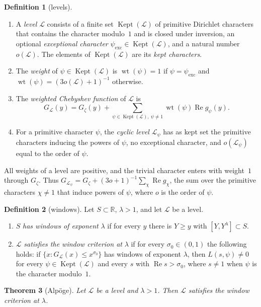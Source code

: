\documentclass[11pt]{amsbook}
\theoremstyle{plain}
\newtheorem{theorem}{Theorem}[section]
\theoremstyle{definition}
\newtheorem{definition}[theorem]{Definition}
\theoremstyle{remark}
\numberwithin{equation}{section}
\numberwithin{figure}{chapter}
\numberwithin{table}{chapter}
\newcommand{\R}{\mathbb{R}}
\newcommand{\lev}{\mathscr{L}}
\newcommand{\Gz}{G_{\zeta}}
\newcommand{\Kept}{\operatorname{Kept}}
\newcommand{\wt}{\operatorname{wt}}
\begin{document}
\begin{definition}[levels]\label{def:level}
\begin{enumerate}[label=(\arabic*)]
\item A \emph{level} $\lev$ consists of a finite set $\Kept(\lev)$ of
primitive Dirichlet characters that contains the character
modulo~$1$ and is closed under inversion, an optional
\emph{exceptional character} $\psi_{\mathrm{exc}}\in\Kept(\lev)$, and
a natural number $o(\lev)$. The elements of $\Kept(\lev)$ are its
\emph{kept characters}.
\item The \emph{weight} of $\psi\in\Kept(\lev)$ is $\wt(\psi)=1$ if
$\psi=\psi_{\mathrm{exc}}$ and $\wt(\psi)=(3o(\lev)+1)^{-1}$
otherwise.
\item The \emph{weighted Chebyshev function} of $\lev$ is
\[
G_{\lev}(y)=\Gz(y)+\sum_{\psi\in\Kept(\lev),\ \psi\ne1}
\wt(\psi)\operatorname{Re}g_\psi(y).
\]
\item For a primitive character $\psi$, the \emph{cyclic level}
$\lev_\psi$ has as kept set the primitive characters inducing the
powers of $\psi$, no exceptional character, and $o(\lev_\psi)$ equal
to the order of $\psi$.
\end{enumerate}
\end{definition}

All weights of a level are positive, and the trivial character enters
with weight~$1$ through $\Gz$. Thus $G_{\lev_\psi}=\Gz+(3o+1)^{-1}
\sum_{\chi}\operatorname{Re}g_\chi$, the sum over the primitive
characters $\chi\ne1$ that induce powers of $\psi$, where $o$ is the
order of $\psi$.

\begin{definition}[windows]\label{def:windows}
Let $S\subset\R$, $\lambda>1$, and let $\lev$ be a level.
\begin{enumerate}[label=(\arabic*)]
\item $S$ \emph{has windows of exponent} $\lambda$ if for every $y$
there is $Y\ge y$ with $[Y,Y^\lambda]\subset S$.
\item $\lev$ \emph{satisfies the window criterion at} $\lambda$ if for
every $\sigma_0\in(0,1)$ the following holds: if
$\{x:G_{\lev}(x)\le x^{\sigma_0}\}$ has windows of exponent
$\lambda$, then $L(s,\psi)\ne0$ for every $\psi\in\Kept(\lev)$ and
every $s$ with $\operatorname{Re}s>\sigma_0$, where $s\ne1$ when
$\psi$ is the character modulo~$1$.
\end{enumerate}
\end{definition}

\begin{theorem}[Alp\"oge]\label{thm:level-criterion}
Let $\lev$ be a level and $\lambda>1$. Then $\lev$ satisfies the
window criterion at $\lambda$.
\end{theorem}
\end{document}
